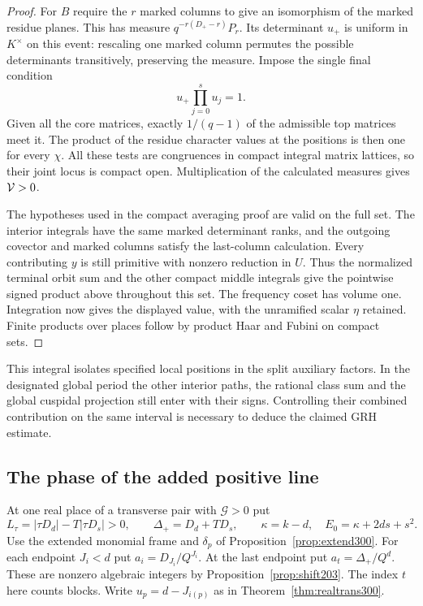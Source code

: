 \documentclass[a4paper,11pt]{article}
\theoremstyle{definition}
\theoremstyle{remark}
\numberwithin{equation}{section}
\begin{document}
\begin{proof}
For \(B\) require the \(r\) marked columns to give an
isomorphism of the marked residue planes. This has measure
\(q^{-r(D_+-r)}P_r\). Its determinant \(u_+\) is uniform
in \(K^\times\) on this event: rescaling one marked column
permutes the possible determinants transitively, preserving
the measure. Impose the single final condition
\[
                u_+\prod_{j=0}^s u_j=1 .
\]
Given all the core matrices, exactly \(1/(q-1)\) of
the admissible top matrices meet it. The product of the
residue character values at the positions is then one
for every \(\chi\). All these tests are congruences in
compact integral matrix lattices, so their joint locus
is compact open. Multiplication of the calculated measures
gives \({\cal V}>0\).

The hypotheses used in the compact averaging proof are
valid on the full set. The interior integrals have the
same marked determinant ranks, and the outgoing covector
and marked columns satisfy the last-column calculation.
Every contributing \(y\) is still primitive with nonzero
reduction in \(U\). Thus the normalized terminal orbit
sum and the other compact middle integrals give the
pointwise signed product above throughout this set.
The frequency coset has volume one. Integration now
gives the displayed value, with the unramified scalar
\(\eta\) retained. Finite products over places follow
by product Haar and Fubini on compact sets.
\end{proof}

This integral isolates specified local positions in the
split auxiliary factors. In the designated global period
the other interior paths, the rational class sum and the
global cuspidal projection still enter with their signs.
Controlling their combined contribution on the same
interval is necessary to deduce the claimed GRH estimate.

\subsection{The phase of the added positive line}\label{nav:V-55}
At one real place of a transverse pair with \(\mathcal G>0\)
put
\[
 L_\tau=|\tau D_d|-T|\tau D_s|>0,\qquad
 \Delta_+=D_d+T D_s,\qquad \kappa=k-d,\quad E_0=\kappa+2ds+s^2 .
\]
Use the extended monomial frame and \(\delta_p\) of
Proposition~\ref{prop:extend300}. For each endpoint \(J_i<d\)
put \(a_i=D_{J_i}/Q^{J_i}\). At the last endpoint put
\(a_t=\Delta_+/Q^d\). These are nonzero algebraic integers by
Proposition~\ref{prop:shift203}. The index \(t\) here counts
blocks. Write \(u_p=d-J_{i(p)}\) as in Theorem~\ref{thm:realtrans300}.
\end{document}
